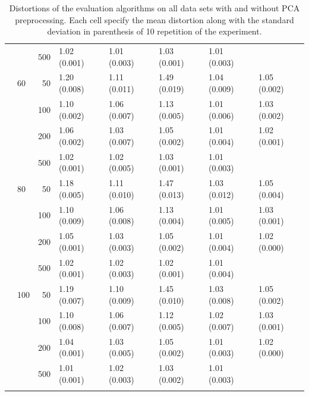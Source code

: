 \begin{longtable}{p{}lrlllll}
      &     & 500 &   1.02 (0.001) &   1.01 (0.003) &   1.03 (0.001) &         1.01 (0.003) &            \\
      & 60  & 50  &   1.20 (0.008) &   1.11 (0.011) &   1.49 (0.019) &         1.04 (0.009) &  1.05 (0.002) \\
      &     & 100 &   1.10 (0.002) &   1.06 (0.007) &   1.13 (0.005) &         1.01 (0.006) &  1.03 (0.002) \\
      &     & 200 &   1.06 (0.002) &   1.03 (0.007) &   1.05 (0.002) &         1.01 (0.004) &  1.02 (0.001) \\
      &     & 500 &   1.02 (0.001) &   1.02 (0.005) &   1.03 (0.001) &         1.01 (0.003) &            \\
      & 80  & 50  &   1.18 (0.005) &   1.11 (0.010) &   1.47 (0.013) &         1.03 (0.012) &  1.05 (0.004) \\
      &     & 100 &   1.10 (0.009) &   1.06 (0.008) &   1.13 (0.004) &         1.01 (0.005) &  1.03 (0.001) \\
      &     & 200 &   1.05 (0.001) &   1.03 (0.003) &   1.05 (0.002) &         1.01 (0.004) &  1.02 (0.000) \\
      &     & 500 &   1.02 (0.001) &   1.02 (0.003) &   1.02 (0.001) &         1.01 (0.004) &            \\
      & 100 & 50  &   1.19 (0.007) &   1.10 (0.009) &   1.45 (0.010) &         1.03 (0.008) &  1.05 (0.002) \\
      &     & 100 &   1.10 (0.008) &   1.06 (0.007) &   1.12 (0.005) &         1.02 (0.007) &  1.03 (0.001) \\
      &     & 200 &   1.04 (0.001) &   1.03 (0.005) &   1.05 (0.002) &         1.01 (0.003) &  1.02 (0.000) \\
      &     & 500 &   1.01 (0.001) &   1.02 (0.003) &   1.03 (0.002) &         1.01 (0.003) &            \\
\bottomrule
\caption{Distortions of the evaluation algorithms on all data sets with and without PCA preprocessing. Each cell specify the mean distortion along with the standard deviation in parenthesis of 10 repetition of the experiment.}
\label{tab:distortions-mean-std}
\end{longtable}




